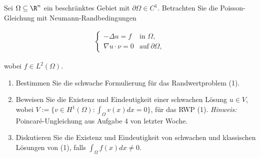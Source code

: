 
\begin{exercise}

Sei $\Omega \subseteq \R^n$ ein beschränktes Gebiet mit $\partial\Omega \in C^1$.
Betrachten Sie die Poisson-Gleichung mit Neumann-Randbedingungen

\begin{align}
    \begin{cases}
    -\Delta u = f & \text{in } \Omega, \\
    \nabla u \cdot \nu = 0 & \text{auf}~ \partial\Omega,
    \end{cases}
    \label{neumann}
\end{align}

wobei $f \in L^2(\Omega)$.

\begin{enumerate}[label = \alph*)]

    \item Bestimmen Sie die schwache Formulierung für das Randwertproblem (1).

    \item Beweisen Sie die Existenz und Eindeutigkeit einer schwachen Lösung $u \in V$, wobei $V := \{v \in H^1(\Omega): \int_\Omega v(x)dx = 0\}$, für das RWP (1).
    \textit{Hinweis:}
    Poincaré-Ungleichung aus Aufgabe 4 von letzter Woche.

    \item Diskutieren Sie die Existenz und Eindeutigkeit von schwachen und klassischen Lösungen von (1), falls $\int_\Omega f(x)dx \neq 0$.

\end{enumerate}

\end{exercise}


